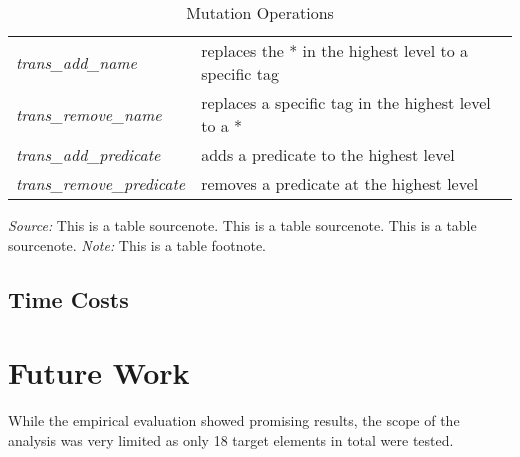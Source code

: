 \documentclass[format=acmlarge, nonacm=true]{acmart}
\begin{document}
\begin{table}
	\caption{Mutation Operations}
	\label{tab:conf}
	\begin{minipage}{\columnwidth}
		\begin{center}
			\begin{tabular}{ll}
				\toprule
					\emph{trans\_add\_name} & replaces the * in the highest level to a specific tag \\
					\emph{trans\_remove\_name} & replaces a specific tag in the highest level to a *\\
				\midrule
					\emph{trans\_add\_predicate} & adds a predicate to the highest level \\
					\emph{trans\_remove\_predicate} & removes a predicate at the highest level \\
				\bottomrule
			\end{tabular}
		\end{center}
		\bigskip
		\footnotesize\emph{Source:} This is a table
		sourcenote. This is a table sourcenote. This is a table
		sourcenote.
		\emph{Note:} This is a table footnote.
	\end{minipage}
\end{table}
\subsection{Time Costs}



\section{Future Work}
While the empirical evaluation showed promising results, the scope of the analysis was very limited as only 18 target elements in total were tested. 
\end{document}
